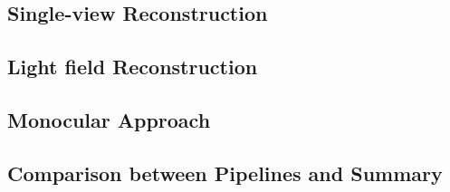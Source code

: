 \subsection{Single-view Reconstruction}
\subsection{Light field Reconstruction}
\subsection{Monocular Approach}

\subsection{Comparison between Pipelines and Summary}





